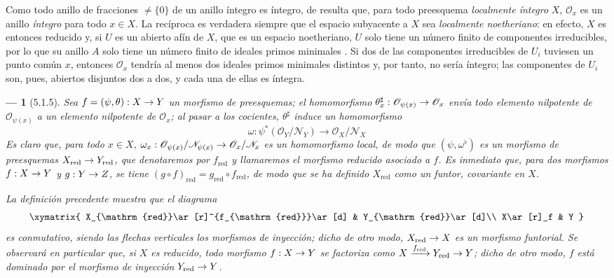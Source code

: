 \documentclass[oneside]{amsart}
\theoremstyle{ega-env-style}
\newtheorem*{env}{---}
\theoremstyle{ega-thm-env-style}
\theoremstyle{ega-defn-env-style}
\renewcommand{\to}{\mathchoice{\longrightarrow}{\rightarrow}{\rightarrow}{\rightarrow}}
\newcommand{\oldpage}[2][]{{\marginnote{\normalfont{\textbf{#1}~|~#2}}}\ignorespaces}
\let\EGAOriginalLabel\label
\renewcommand{\label}[1]{\phantomsection\EGAOriginalLabel{#1}}
\begin{document}
Como todo anillo de fracciones $\ne\{0\}$ de un anillo íntegro es íntegro, de  resulta que, para todo preesquema \emph{localmente íntegro} $X$, $\mathscr{O}_x$ es un anillo \emph{íntegro} para todo $x\in X$.
La recíproca es verdadera siempre que el espacio subyacente a $X$ sea \emph{localmente noetheriano}:
en efecto, $X$ es entonces reducido y, si $U$ es un abierto afín de $X$, que es un espacio noetheriano, $U$ solo tiene un número finito de componentes irreducibles, por lo que su anillo $A$ solo tiene un número finito de ideales primos minimales .
Si dos de las componentes irreducibles de $U_i$ tuviesen un punto común $x$, entonces $\mathscr{O}_x$ tendría al menos dos ideales primos minimales distintos y, por tanto, no sería íntegro;
las componentes de $U_i$ son, pues, abiertos disjuntos dos a dos, y cada una de ellas es íntegra.

\begin{env}[5.1.5]
\label{I.5.1.5}
Sea $f=(\psi,\theta):X\to Y$ un morfismo de preesquemas;
\oldpage[I]{129}
el homomorfismo $\theta_x^\sharp:\mathscr{O}_{\psi(x)}\to\mathscr{O}_x$ envía todo elemento nilpotente de $\mathscr{O}_{\psi(x)}$ a un elemento nilpotente de $\mathscr{O}_x$;
al pasar a los cocientes, $\theta^\sharp$ induce un homomorfismo
\[
  \omega:\psi^*(\mathscr{O}_Y/\mathscr{N}_Y)
  \longrightarrow \mathscr{O}_X/\mathscr{N}_X
\]
Es claro que, para todo $x\in X$, $\omega_x:\mathscr{O}_{\psi(x)}/\mathscr{N}_{\psi(x)}
\to\mathscr{O}_x/\mathscr{N}_x$ es un homomorfismo local, de modo que $(\psi,\omega^\flat)$ es un morfismo de preesquemas $X_{\mathrm{red}}\to Y_{\mathrm{red}}$, que denotaremos por $f_{\mathrm{red}}$ y llamaremos el morfismo \emph{reducido} asociado a $f$.
Es inmediato que, para dos morfismos $f:X\to Y$ y $g:Y\to Z$, se tiene $(g\circ f)_{\mathrm{red}}=g_{\mathrm{red}}\circ f_{\mathrm{red}}$, de modo que se ha definido $X_{\mathrm{red}}$ como un \emph{funtor}, \emph{covariante} en $X$.

La definición precedente muestra que el diagrama
\[
  \xymatrix{
    X_{\mathrm{red}}\ar[r]^{f_{\mathrm{red}}}\ar[d] &
    Y_{\mathrm{red}}\ar[d]\\
    X\ar[r]_f & Y
  }
\]
es conmutativo, siendo las flechas verticales los morfismos de inyección;
dicho de otro modo, $X_{\mathrm{red}}\to X$ es un morfismo \emph{funtorial}.
Se observará en particular que, si $X$ es reducido, todo morfismo $f:X\to Y$ se factoriza como $X\xrightarrow{f_{\mathrm{red}}}Y_{\mathrm{red}}\to Y$;
dicho de otro modo, $f$ está dominado por el morfismo de inyección $Y_{\mathrm{red}}\to Y$.
\end{env}
\end{document}
